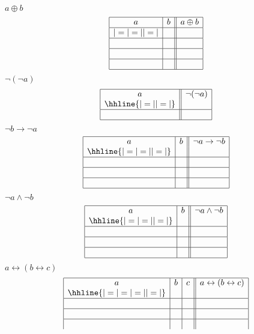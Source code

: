 \documentclass{exam}
\def\land{\wedge}           %
\def\lnot{\neg}             %
\def\liff{\leftrightarrow}  %
\def\xor{\oplus}            %
\begin{document}
\begin{questions}
\noindent
$a \xor b$
$$
\begin{array}{|c|c||c|}
  \hline
  a  & b  & a \xor b \\
  \hline{|=|=||=|}
     &    &          \\
  \hline
     &    &          \\
  \hline
     &    &          \\
  \hline
     &    &          \\
  \hline
\end{array} 
$$
$\lnot (\lnot a)$
$$
\begin{array}{|c||c|}
  \hline
  a  & \lnot (\lnot a) \\
  \hhline{|=||=|}
     &                 \\
  \hline
     &                 \\
  \hline
\end{array} 
$$
$\lnot b \to \lnot a$
$$
\begin{array}{|c|c||c|}
  \hline
  a  & b  & \lnot a \to \lnot b   \\
  \hhline{|=|=||=|}
     &    &                       \\
  \hline
     &    &                       \\
  \hline
     &    &                       \\
  \hline
     &    &                       \\
  \hline
\end{array} 
$$
$\lnot a \land \lnot b$
$$
\begin{array}{|c|c||c|}
  \hline
  a  & b  & \lnot a \land \lnot b \\
  \hhline{|=|=||=|}
     &    &                       \\
  \hline
     &    &                       \\
  \hline
     &    &                       \\
  \hline
     &    &                       \\
  \hline
\end{array} 
$$
$a \liff (b \liff c)$
$$
\begin{array}{|c|c|c||c|}
  \hline
  a  & b  & c  & a \liff (b \liff c) \\
  \hhline{|=|=|=||=|}
     &    &    &                     \\
  \hline
     &    &    &                     \\
  \hline
     &    &    &                     \\
  \hline
     &    &    &                     \\

\end{array}$$
\end{questions}
\end{document}

